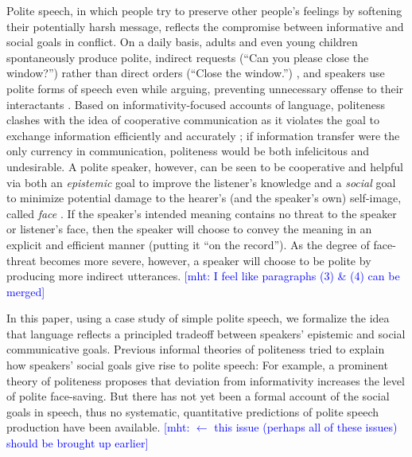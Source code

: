 \documentclass[12pt]{article}
\newcommand{\mht}[1]{\textcolor{Blue}{[mht: #1]}}
\begin{document}
Polite speech, in which people try to preserve other people's feelings by softening their potentially harsh message, 
reflects the compromise between informative and social goals in conflict.
On a daily basis,
adults and even young children spontaneously produce polite, indirect requests (``Can you please close the window?'') 
rather than direct orders (``Close the window.'') \cite{clark1980, axia1985}, 
and speakers use polite forms of speech even while arguing, preventing unnecessary offense to their interactants \cite{holtgraves1997}. 
Based on informativity-focused accounts of language, politeness clashes with the idea of cooperative communication 
as it violates the goal to exchange information efficiently and accurately \cite{grice1975};
if information transfer were the only currency in communication, politeness would be both infelicitous and undesirable.  
A polite speaker, however, can be seen to be cooperative and helpful via 
both an \emph{epistemic} goal to improve the listener's knowledge and 
a \emph{social} goal to minimize potential damage to the hearer's (and the speaker's own) self-image, called \emph{face} \cite{brown1987}. 
If the speaker's intended meaning contains no threat to the speaker or listener's face, 
then the speaker will choose to convey the meaning in an explicit and efficient manner (putting it \enquote{on the record}). 
As the degree of face-threat becomes more severe, however, a speaker will choose to be polite by producing more indirect utterances. 
\mht{I feel like paragraphs (3) \& (4) can be merged}

In this paper, using a case study of simple polite speech, 
we formalize the idea that language reflects a principled tradeoff between speakers' epistemic and social communicative goals.
Previous informal theories of politeness tried to explain how speakers' social goals give rise to polite speech: 
For example, a prominent theory of politeness \cite{brown1987} proposes that
deviation from informativity increases the level of polite face-saving.
But there has not yet been a formal account of the social goals in speech, 
thus no systematic, quantitative predictions of polite speech production have been available.
\mht{$\leftarrow$ this issue (perhaps all of these issues) should be brought up earlier}
\end{document}

